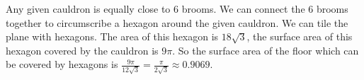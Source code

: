 


Any given cauldron is equally close to 6 brooms. We can connect the 6 brooms together to circumscribe a hexagon around the given cauldron. We can tile the plane with hexagons. The area of this hexagon is $18\sqrt{3}$, the surface area of this hexagon covered by the cauldron is $9\pi$. So the surface area of the floor which can be covered by hexagons is $\frac{9\pi}{12\sqrt{3}}=\frac{\pi}{2\sqrt{3}} \approx 0.9069$.
